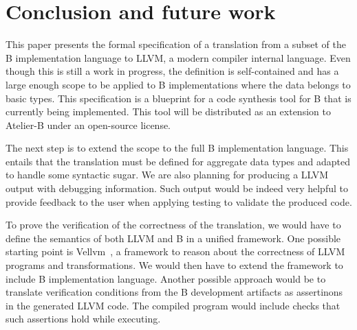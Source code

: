 \documentclass{llncs}
\begin{document}
\section{Conclusion and future work}
\label{sec:conclusion}

This paper presents the formal specification of a translation from a subset of
the B implementation language to LLVM, a modern compiler internal language.
Even though this is still a work in progress, the definition is self-contained
and has a large enough scope to be applied to B implementations where the data
belongs to basic types. This specification is a blueprint for a code synthesis
tool for B that is currently being implemented. This tool will be distributed
as an extension to Atelier-B under an open-source license.

The next step is to extend the scope to the full B implementation language. This
entails that the translation must be defined for aggregate data types and
adapted to handle some syntactic sugar. We are also planning for producing a
LLVM output with debugging information. Such output would be indeed very helpful
to provide feedback to the user when applying testing to validate the produced
code.

To prove the verification of the correctness of the translation, we would have
to define the semantics of both LLVM and B in a unified framework. One possible
starting point is Vellvm~\cite{vellvm}, a framework to reason about the
correctness of LLVM programs and transformations. We would then have to extend
the framework to include B implementation language. Another possible approach
would be to translate verification conditions from the B development artifacts
as assertinons in the generated LLVM code. The compiled program would include
checks that such assertions hold while executing.



\end{document}
